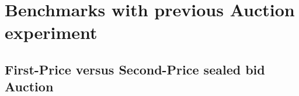 \documentclass{article} %
\begin{document}


\section{Benchmarks with previous Auction experiment}\label{results}








\subsection{First-Price versus Second-Price sealed bid Auction }\label{section:classic}
\end{document}
